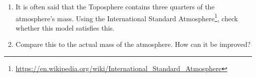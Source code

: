 \begin{enumerate}
\begin{enumerate}
	\item It is often said that the Toposphere contains three quarters of the atmosphere's mass. Using the International Standard Atmosphere\footnote{\url{https://en.wikipedia.org/wiki/International_Standard_Atmosphere}}, check whether this model satisfies this.
	
	\item Compare this to the actual mass of the atmosphere. How can it be improved?

	
\end{enumerate}


	
	
	
	
\end{enumerate}

















